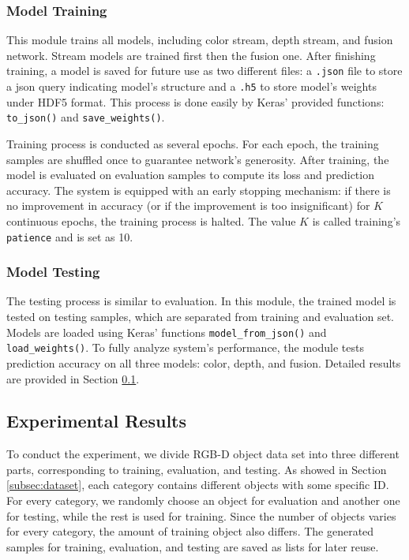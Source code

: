 \subsubsection{Model Training}
This module trains all models, including color stream, depth stream, and fusion network. Stream models are trained first then the fusion one. After finishing training, a model is saved for future use as two different files: a \texttt{.json} file to store a json query indicating model's structure and a \texttt{.h5} to store model's weights under HDF5 format. This process is done easily by Keras' provided functions: \texttt{to\_json()} and \texttt{save\_weights()}.

Training process is conducted as several epochs. For each epoch, the training samples are shuffled once to guarantee network's generosity. After training, the model is evaluated on evaluation samples to compute its loss and prediction accuracy. The system is equipped with an early stopping mechanism: if there is no improvement in accuracy (or if the improvement is too insignificant) for $K$ continuous epochs, the training process is halted. The value $K$ is called training's \texttt{patience} and is set as 10.

\subsubsection{Model Testing}
The testing process is similar to evaluation. In this module, the trained model is tested on testing samples, which are separated from training and evaluation set. Models are loaded using Keras' functions \texttt{model\_from\_json()} and \texttt{load\_weights()}. To fully analyze system's performance, the module tests prediction accuracy on all three models: color, depth, and fusion. Detailed results are provided in Section \ref{subsec:exp_result}.

\subsection{Experimental Results}
\label{subsec:exp_result}

To conduct the experiment, we divide RGB-D object data set into three different parts, corresponding to training, evaluation, and testing. As showed in Section \ref{subsec:dataset}, each category contains different objects with some specific ID. For every category, we randomly choose an object for evaluation and another one for testing, while the rest is used for training. Since the number of objects varies for every category, the amount of training object also differs. The generated samples for training, evaluation, and testing are saved as lists for later reuse.

